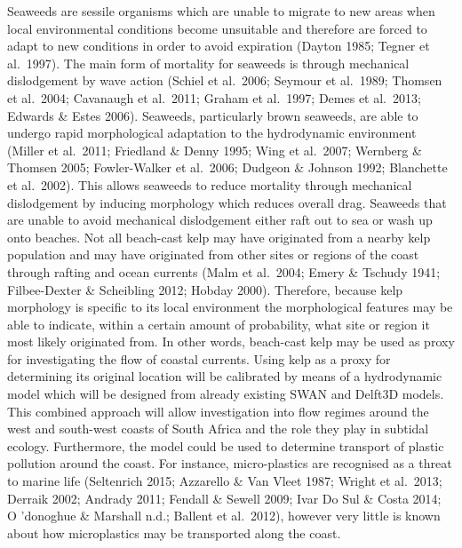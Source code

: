 \documentclass[]{article}
\begin{document}
Seaweeds are sessile organisms which are unable to migrate to new areas
when local environmental conditions become unsuitable and therefore are
forced to adapt to new conditions in order to avoid expiration (Dayton
1985; Tegner et al.~1997). The main form of mortality for seaweeds is
through mechanical dislodgement by wave action (Schiel et al.~2006;
Seymour et al.~1989; Thomsen et al.~2004; Cavanaugh et al.~2011; Graham
et al.~1997; Demes et al.~2013; Edwards \& Estes 2006). Seaweeds,
particularly brown seaweeds, are able to undergo rapid morphological
adaptation to the hydrodynamic environment (Miller et al.~2011;
Friedland \& Denny 1995; Wing et al.~2007; Wernberg \& Thomsen 2005;
Fowler-Walker et al.~2006; Dudgeon \& Johnson 1992; Blanchette et
al.~2002). This allows seaweeds to reduce mortality through mechanical
dislodgement by inducing morphology which reduces overall drag. Seaweeds
that are unable to avoid mechanical dislodgement either raft out to sea
or wash up onto beaches. Not all beach-cast kelp may have originated
from a nearby kelp population and may have originated from other sites
or regions of the coast through rafting and ocean currents (Malm et
al.~2004; Emery \& Tschudy 1941; Filbee-Dexter \& Scheibling 2012;
Hobday 2000). Therefore, because kelp morphology is specific to its
local environment the morphological features may be able to indicate,
within a certain amount of probability, what site or region it most
likely originated from. In other words, beach-cast kelp may be used as
proxy for investigating the flow of coastal currents. Using kelp as a
proxy for determining its original location will be calibrated by means
of a hydrodynamic model which will be designed from already existing
SWAN and Delft3D models. This combined approach will allow investigation
into flow regimes around the west and south-west coasts of South Africa
and the role they play in subtidal ecology. Furthermore, the model could
be used to determine transport of plastic pollution around the coast.
For instance, micro-plastics are recognised as a threat to marine life
(Seltenrich 2015; Azzarello \& Van Vleet 1987; Wright et al.~2013;
Derraik 2002; Andrady 2011; Fendall \& Sewell 2009; Ivar Do Sul \& Costa
2014; O 'donoghue \& Marshall n.d.; Ballent et al.~2012), however very
little is known about how microplastics may be transported along the
coast.
\end{document}
